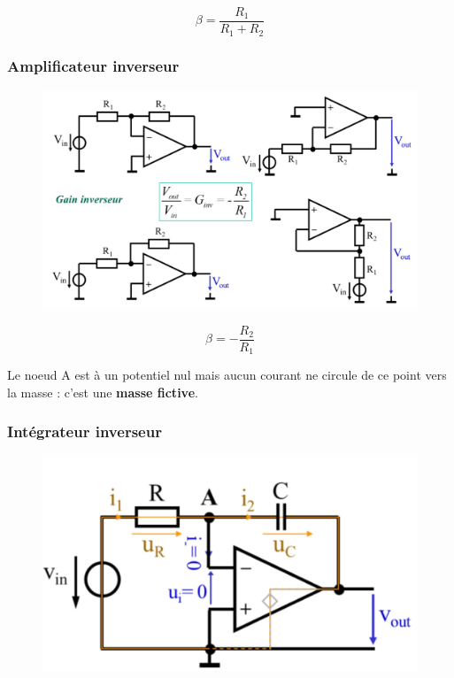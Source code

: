 \documentclass[../main.tex]{subfiles}
\begin{document}
\begin{equation}
    \beta = \frac{R_1}{R_1+R_2}
\end{equation}


\subsubsection{Amplificateur inverseur}

\begin{figure}[hbt!]
    \centering
    \includegraphics[width=.7\textwidth]{IMAGES/elec/IMG_0132.jpeg}
\end{figure}

\begin{equation}
    \beta = -\frac{R_2}{R_1}
\end{equation}

Le noeud A est à un potentiel nul mais aucun courant ne circule de ce point vers la masse : c'est une \textbf{masse fictive}.\\

\subsubsection{Intégrateur inverseur}

\begin{figure}[hbt!]
    \centering
    \includegraphics[width=.7\textwidth]{IMAGES/elec/IMG_0133.jpeg}
\end{figure}
\end{document}
